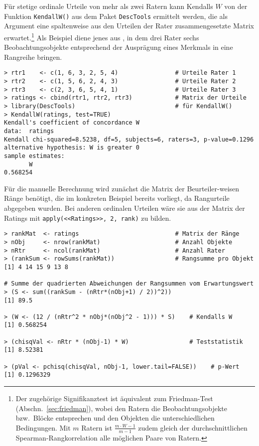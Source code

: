 Für stetige ordinale Urteile von mehr als zwei Ratern kann Kendalls $W$ von der Funktion \lstinline!KendallW()! aus dem Paket \lstinline!DescTools! ermittelt werden, die als Argument eine spaltenweise aus den Urteilen der Rater zusammengesetzte Matrix erwartet.\footnote{Der zugehörige Signifikanztest ist äquivalent zum Friedman-Test (Abschn.\ \ref{sec:friedman}), wobei den Ratern die Beobachtungsobjekte bzw.\ Blöcke entsprechen und den Objekten die unterschiedlichen Bedingungen. Mit $m$ Ratern ist $\frac{m \cdot W-1}{m-1}$ zudem gleich der durchschnittlichen Spearman-Rangkorrelation alle möglichen Paare von Ratern.} Als Beispiel diene jenes aus , in dem drei Rater sechs Beobachtungsobjekte entsprechend der Ausprägung eines Merkmals in eine Rangreihe bringen.
\begin{lstlisting}
> rtr1    <- c(1, 6, 3, 2, 5, 4)                # Urteile Rater 1
> rtr2    <- c(1, 5, 6, 2, 4, 3)                # Urteile Rater 2
> rtr3    <- c(2, 3, 6, 5, 4, 1)                # Urteile Rater 3
> ratings <- cbind(rtr1, rtr2, rtr3)            # Matrix der Urteile
> library(DescTools)                            # für KendallW()
> KendallW(ratings, test=TRUE)
Kendall's coefficient of concordance W
data:  ratings
Kendall chi-squared=8.5238, df=5, subjects=6, raters=3, p-value=0.1296
alternative hypothesis: W is greater 0
sample estimates:
       W
0.568254
\end{lstlisting}

Für die manuelle Berechnung wird zunächst die Matrix der Beurteiler-weisen Ränge benötigt, die im konkreten Beispiel bereits vorliegt, da Rangurteile abgegeben wurden. Bei anderen ordinalen Urteilen wäre sie aus der Matrix der Ratings mit \lstinline!apply(<<Ratings>>, 2, rank)! zu bilden.
\begin{lstlisting}
> rankMat  <- ratings                           # Matrix der Ränge
> nObj     <- nrow(rankMat)                     # Anzahl Objekte
> nRtr     <- ncol(rankMat)                     # Anzahl Rater
> (rankSum <- rowSums(rankMat))                 # Rangsumme pro Objekt
[1] 4 14 15 9 13 8

# Summe der quadrierten Abweichungen der Rangsummen vom Erwartungswert
> (S <- sum((rankSum - (nRtr*(nObj+1) / 2))^2))
[1] 89.5

> (W <- (12 / (nRtr^2 * nObj*(nObj^2 - 1))) * S)    # Kendalls W
[1] 0.568254

> (chisqVal <- nRtr * (nObj-1) * W)                 # Teststatistik
[1] 8.52381

> (pVal <- pchisq(chisqVal, nObj-1, lower.tail=FALSE))    # p-Wert
[1] 0.1296329
\end{lstlisting}

